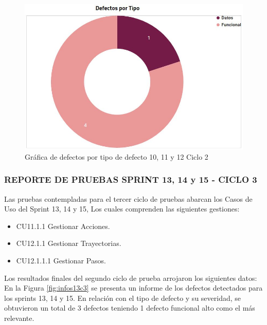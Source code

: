 \begin{figure}[H]
	\begin{center}
		\includegraphics[width=.75\textwidth]{images/pruebas/s10c2-2}
		\caption{Gráfica de defectos por tipo de defecto 10, 11 y 12  Ciclo 2}
		\label{fig:infos10c2-2}
	\end{center}
\end{figure}

\subsubsection{REPORTE DE PRUEBAS SPRINT 13, 14 y 15 - CICLO 3}

Las pruebas contempladas para el tercer ciclo de pruebas abarcan los Casos de Uso del Sprint 13, 14 y 15, Los cuales comprenden las siguientes gestiones:

\begin{itemize}
	\item CU11.1.1 Gestionar Acciones.
	\item CU12.1.1 Gestionar Trayectorias.
	\item CU12.1.1.1 Gestionar Pasos.
\end{itemize}

Los resultados finales del segundo ciclo de prueba arrojaron los siguientes datos:\\

En la Figura \ref{fig:infos13c3} se presenta un informe de los defectos detectados para los sprints 13, 14 y 15. En relación con el tipo de defecto y su severidad, se obtuvieron un total de 3 defectos teniendo 1 defecto funcional alto como el más relevante.

